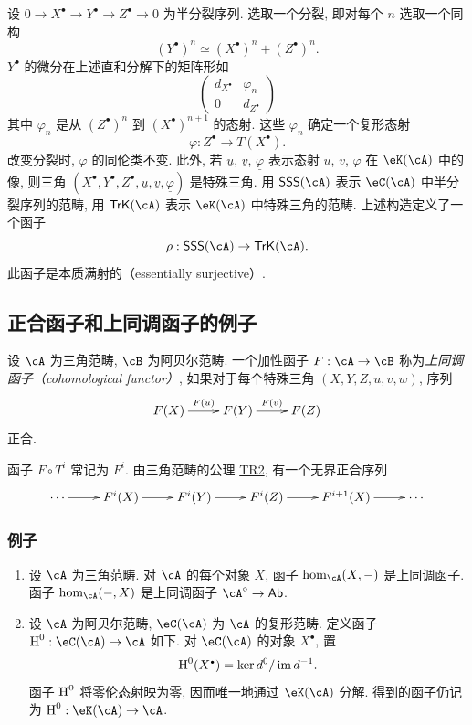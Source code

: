 设 $0 \to X^\bullet \to Y^\bullet \to Z^\bullet \to 0$ 为半分裂序列. 选取一个分裂, 即对每个 $n$ 选取一个同构
\[
  (Y^\bullet)^n \simeq (X^\bullet)^n + (Z^\bullet)^n \text{.}
\]
$Y^\bullet$ 的微分在上述直和分解下的矩阵形如
\[
  \begin{pmatrix}
    d_{X^\bullet} & \varphi_n \\
    0 & d_{Z^\bullet}
  \end{pmatrix}
\]
其中 $\varphi_n$ 是从 $(Z^\bullet)^n$ 到 $(X^\bullet)^{n+1}$ 的态射. 这些 $\varphi_n$ 确定一个复形态射
\[
  \varphi:Z^\bullet \to T(X^\bullet) \text{.}
\]
改变分裂时, $\varphi$ 的同伦类不变. 此外, 若 $\underline u$, $\underline v$, $\underline\varphi$ 表示态射 $u$, $v$, $\varphi$ 在 $\eK(\cA)$ 中的像, 则三角 $(X^\bullet,Y^\bullet,Z^\bullet,\underline u,\underline v,\underline\varphi)$ 是特殊三角. 用 $\mathsf{SSS}(\cA)$ 表示 $\eC(\cA)$ 中半分裂序列的范畴, 用 $\mathsf{TrK}(\cA)$ 表示 $\eK(\cA)$ 中特殊三角的范畴. 上述构造定义了一个函子
\[
  \rho:\mathsf{SSS}(\cA) \to \mathsf{TrK}(\cA) \text{.}
\]
此函子是本质满射的（essentially surjective）.

\subsection{正合函子和上同调函子的例子}\label{VIII:1-3}

\begin{definition}
设 $\cA$ 为三角范畴, $\cB$ 为阿贝尔范畴. 一个加性函子 $F:\cA\to \cB$ 称为\emph{上同调函子（cohomological functor）}, 如果对于每个特殊三角 $(X,Y,Z,u,v,w)$, 序列
\[\xymatrix{
  F(X) \ar[r]^-{F(u)}
    & F(Y) \ar[r]^-{F(v)}
    & F(Z)
}\]
正合.
\end{definition}

函子 $F\circ T^i$ 常记为 $F^i$. 由三角范畴的公理 \hyperlink{VIII:TR2}{TR2}, 有一个无界正合序列
\[\xymatrix{
  \cdots \ar[r]
    & F^i(X) \ar[r]
    & F^i(Y) \ar[r]
    & F^i(Z) \ar[r]
    & F^{i+1}(X) \ar[r]
    & \cdots
}\]

\subsubsection{例子}\label{VIII:1-3-2}

\begin{enumerate}
  \item 设 $\cA$ 为三角范畴. 对 $\cA$ 的每个对象 $X$, 函子 $\hom_\cA(X,-)$ 是上同调函子. 函子 $\hom_\cA(-,X)$ 是上同调函子 $\cA^\circ\to\mathsf{Ab}$.
  \item 设 $\cA$ 为阿贝尔范畴, $\eC(\cA)$ 为 $\cA$ 的复形范畴. 定义函子 $\h^0:\eC(\cA)\to\cA$ 如下. 对 $\eC(\cA)$ 的对象 $X^\bullet$, 置
    \[
      \h^0(X^\bullet) = \ker d^0 / \im{d^{-1}} \text{.}
    \]
    函子 $\operatorname{H}^0$ 将零伦态射映为零, 因而唯一地通过 $\eK(\cA)$ 分解. 得到的函子仍记为 $\h^0:\eK(\cA) \to \cA$.
\end{enumerate}

